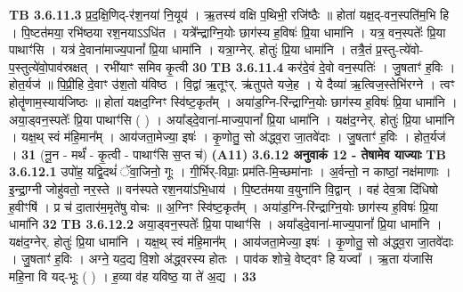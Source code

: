 \documentclass[17pt]{extarticle}
\begin{document}
{{{{{{{{{{{{{{{{{{{                  \newline
                                \textbf{ TB 3.6.11.3} \newline
                  प्र॒द॒क्षि॒णिद्-र॑श॒नया॑ नि॒यूय॑ । ऋ॒तस्य॑ वक्षि प॒थिभी॒ रजि॑ष्ठैः ॥ होता॑ यक्ष॒द्-वन॒स्पति॑म॒भि हि । पि॒ष्टत॑मया॒ रभि॑ष्ठया रश॒नयाऽऽधि॑त । यत्रे᳚न्द्राग्नि॒योः छाग॑स्य ह॒विषः॑ प्रि॒या धामा॑नि । यत्र॒ वन॒स्पतेः᳚ प्रि॒या पाथाꣳ॑सि । यत्र॑ दे॒वाना॑माज्य॒पानां᳚ प्रि॒या धामा॑नि । यत्रा॒ग्नेर्. होतुः॑ प्रि॒या धामा॑नि । तत्रै॒तं प्र॒स्तु-त्ये॑वो-प॒स्तुत्ये॑वो॒पाव॑स्रक्षत् । रभी॑याꣳ समिव कृ॒त्वी \textbf{ 30} \newline
                  \newline
                                \textbf{ TB 3.6.11.4} \newline
                  कर॑दे॒वं दे॒वो वन॒स्पतिः॑ । जु॒षताꣳ॑ ह॒विः । होत॒र्यज॑ ॥ पि॒प्री॒हि दे॒वाꣳ उ॑श॒तो य॑विष्ठ । वि॒द्वां ऋ॒तूꣳर्. ऋ॑तुपते यजे॒ह । ये दैव्या॑ ऋ॒त्विज॒स्तेभि॑रग्ने । त्वꣳ होतॄ॑णाम॒स्याय॑जिष्ठः ॥ होता॑ यक्षद॒ग्निꣳ स्वि॑ष्ट॒कृत᳚म् । अया॑ड॒ग्नि-रि॑न्द्राग्नि॒योः छाग॑स्य ह॒विषः॑ प्रि॒या धामा॑नि । अया॒ड्वन॒स्पतेः᳚ प्रि॒या पाथाꣳ॑सि ( ) । अया᳚ड्दे॒वाना॑-माज्य॒पानां᳚ प्रि॒या धामा॑नि । यक्ष॑द॒ग्नेर्. होतुः॑ प्रि॒या धामा॑नि । यक्ष॒थ् स्वं म॑हि॒मान᳚म् । आय॑जता॒मेज्या॒ इषः॑ । कृ॒णोतु॒ सो अ॑द्ध्व॒रा जा॒तवे॑दाः । जु॒षताꣳ॑ ह॒विः । होत॒र्यज॑ । \textbf{ 31} \newline
                  \newline
                                    (नू॒न - मर्थं॑ - कृ॒त्वी - पाथाꣳ॑सि स॒प्त च॑) \textbf{(A11)} \newline \newline
                \textbf{ 3.6.12    अनुवाकं   12 - तेषामेव याज्याः} \newline
                                \textbf{ TB 3.6.12.1} \newline
                  उपो॑ह॒ यद्वि॒दथं॑ ॅवा॒जिनो॒ गूः । गी॒र्भिर्-विप्राः॒ प्रम॑ति-मि॒च्छमा॑नाः । अ॒र्वन्तो॒ न काष्ठां॒ नक्ष॑माणाः । इ॒न्द्रा॒ग्नी जोहु॑वतो॒ नर॒स्ते ॥ वन॑स्पते रश॒नया॑ऽभि॒धाय॑ । पि॒ष्टत॑मया व॒युना॑नि वि॒द्वान् । वह॑ देव॒त्रा दि॑धिषो ह॒वीꣳषि॑ । प्र च॑ दा॒तार॑म॒मृते॑षु वोचः ॥ अ॒ग्निꣳ स्वि॑ष्ट॒कृत᳚म् । अया॑ड॒ग्नि-रि॑न्द्राग्नि॒योः छाग॑स्य ह॒विषः॑ प्रि॒या धामा॑नि \textbf{ 32} \newline
                  \newline
                                \textbf{ TB 3.6.12.2} \newline
                  अया॒ड्वन॒स्पतेः᳚ प्रि॒या पाथाꣳ॑सि । अया᳚ड्दे॒वाना॑-माज्य॒पानां᳚ प्रि॒या धामा॑नि । यक्ष॑द॒ग्नेर्. होतुः॑ प्रि॒या धामा॑नि । यक्ष॒थ् स्वं म॑हि॒मान᳚म् । आय॑जता॒मेज्या॒ इषः॑ । कृ॒णोतु॒ सो अ॑द्ध्व॒रा जा॒तवे॑दाः । जु॒षताꣳ॑ ह॒विः । अग्ने॒ यद॒द्य वि॒शो अ॑द्ध्वरस्य होतः । पाव॑क शोचे॒ वेष्ट्वꣳ हि यज्वा᳚ । ऋ॒ता य॑जासि महि॒ना वि यद्-भूः ( ) । ह॒व्या व॑ह यविष्ठ॒ या ते॑ अ॒द्य । \textbf{ 33} \newline
}}}}}}}}}}}}}}}}}}}
\end{document}
